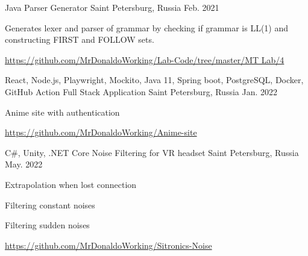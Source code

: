 \begin{cventries}
  \cventry
    {Java}%
    {Parser Generator} %
    {Saint Petersburg, Russia} %
    {Feb. 2021} %
    {
      \begin{cvitems} %
        \item {Generates lexer and parser of grammar by checking if grammar is LL(1) and constructing FIRST and FOLLOW sets.}
        \item {\url{https://github.com/MrDonaldoWorking/Lab-Code/tree/master/MT Lab/4}}
      \end{cvitems}
    }
    
  \cventry
    {React, Node.js, Playwright, Mockito, Java 11, Spring boot, PostgreSQL, Docker, GitHub Action}%
    {Full Stack Application} %
    {Saint Petersburg, Russia} %
    {Jan. 2022} %
    {
      \begin{cvitems} %
        \item {Anime site with authentication}
        \item {\url{https://github.com/MrDonaldoWorking/Anime-site}}
      \end{cvitems}
    }


  \cventry
    {C\#, Unity, .NET Core}%
    {Noise Filtering for VR headset} %
    {Saint Petersburg, Russia} %
    {May. 2022} %
    {
      \begin{cvitems} %
        \item {Extrapolation when lost connection}
        \item {Filtering constant noises}
        \item {Filtering sudden noises}
        \item {\url{https://github.com/MrDonaldoWorking/Sitronics-Noise}}
      \end{cvitems}
    }

    
\end{cventries}
